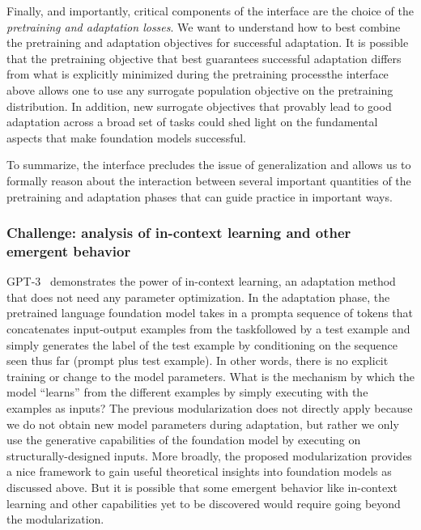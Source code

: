 Finally, and importantly, critical components of the interface are the choice of the \emph{pretraining and adaptation losses}. We want to understand how to best combine the pretraining and adaptation objectives for successful adaptation. It is possible that the pretraining objective that best guarantees successful adaptation differs from what is explicitly minimized during the pretraining process\dash{}the interface above allows one to use any surrogate population objective on the pretraining distribution. In addition, new surrogate objectives that provably lead to good adaptation across a broad set of tasks could shed light on the fundamental aspects that make foundation models successful. 

To summarize, the interface precludes the issue of generalization and allows us to formally reason about the interaction between several important quantities of the pretraining and adaptation phases that can guide practice in important ways.

\subsubsection{Challenge: analysis of in-context learning and other emergent behavior}
\label{sec:theory-incontext}
GPT-3~\citep{brown2020gpt3} demonstrates the power of in-context learning, an adaptation method that does not need any parameter optimization. In the adaptation phase, the pretrained language foundation model takes in a prompt\dash{}a sequence of tokens that concatenates input-output examples from the task\dash{}followed by a test example and simply generates the label of the test example by conditioning on the sequence seen thus far (prompt plus test example). 
In other words, there is no explicit training or change to the model parameters.  
What is the mechanism by which the model ``learns'' from the different examples by simply executing with the examples as inputs?
The previous modularization does not directly apply because we do not obtain new model parameters during adaptation, but rather we only use the generative capabilities of the foundation model by executing on structurally-designed inputs. 
More broadly, the proposed modularization provides a nice framework to gain useful theoretical insights into foundation models as discussed above. But it is possible that some emergent behavior like in-context learning and other capabilities yet to be discovered would require going beyond the modularization.


